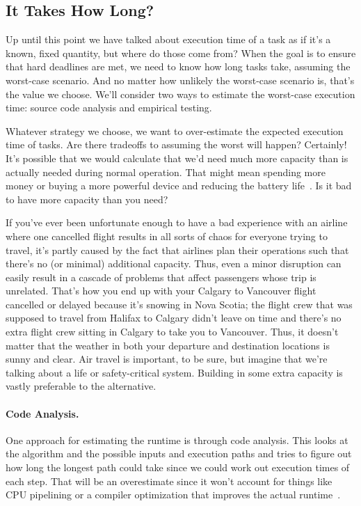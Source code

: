 \subsection*{It Takes How Long?}
Up until this point we have talked about execution time of a task as if it's a known, fixed quantity, but where do those come from? When the goal is to ensure that hard deadlines are met, we need to know how long tasks take, assuming the worst-case scenario. And no matter how unlikely the worst-case scenario is, that's the value we choose. We'll consider two ways to estimate the worst-case execution time: source code analysis and empirical testing.

Whatever strategy we choose, we want to over-estimate the expected execution time of tasks. Are there tradeoffs to assuming the worst will happen? Certainly! It's possible that we would calculate that we'd need much more capacity than is actually needed during normal operation. That might mean spending more money or buying a more powerful device and reducing the battery life~\cite{mte241}. Is it bad to have more capacity than you need? 

If you've ever been unfortunate enough to have a bad experience with an airline where one cancelled flight results in all sorts of chaos for everyone trying to travel, it's partly caused by the fact that airlines plan their operations such that there's no (or minimal) additional capacity. Thus, even a minor disruption can easily result in a cascade of problems that affect passengers whose trip is unrelated. That's how you end up with your Calgary to Vancouver flight cancelled or delayed because it's snowing in Nova Scotia; the flight crew that was supposed to travel from Halifax to Calgary didn't leave on time and there's no extra flight crew sitting in Calgary to take you to Vancouver. Thus, it doesn't matter that the weather in both your departure and destination locations is sunny and clear. Air travel is important, to be sure, but imagine that we're talking about a life or safety-critical system. Building in some extra capacity is vastly preferable to the alternative.

\paragraph{Code Analysis.} One approach for estimating the runtime is through code analysis. This looks at the algorithm and the possible inputs and execution paths and tries to figure out how long the longest path could take since we could work out execution times of each step. That will be an overestimate since it won't account for things like CPU pipelining or a compiler optimization that improves the actual runtime~\cite{mte241}.

